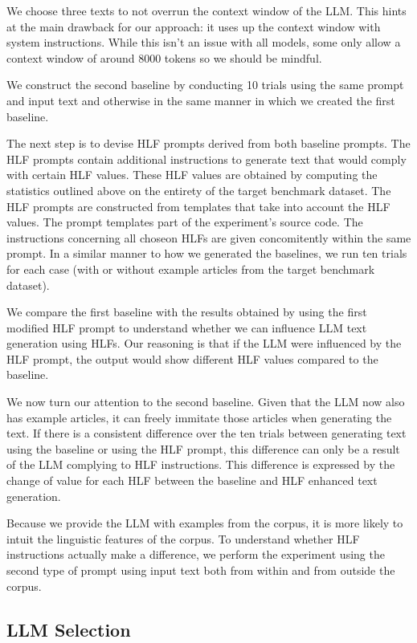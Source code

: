 \documentclass[11pt]{article}
\begin{document}
We choose three texts to not overrun the context window of the LLM.
This hints at the main drawback for our approach: it uses up the context window
with system instructions.
While this isn't an issue with all models, some only allow a context window of
around 8000 tokens so we should be mindful.

We construct the second baseline by conducting 10 trials using the same
prompt and input text and otherwise in the same manner in which we created the
first baseline.

The next step is to devise HLF prompts derived from both baseline prompts.
The HLF prompts contain additional instructions to generate text that would
comply with certain HLF values.
These HLF values are obtained by computing the statistics outlined above on
the entirety of the target benchmark dataset.
The HLF prompts are constructed from templates that take into account the HLF
values.
The prompt templates part of the experiment's source code.
The instructions concerning all choseon HLFs are given concomitently within the
same prompt.
In a similar manner to how we generated the baselines, we run ten trials for
each case (with or without example articles from the target benchmark dataset).

We compare the first baseline with the results obtained by using the first
modified HLF prompt to understand whether we can influence LLM text generation
using HLFs.
Our reasoning is that if the LLM were influenced by the HLF prompt, the output
would show different HLF values compared to the baseline.

We now turn our attention to the second baseline.
Given that the LLM now also has example articles, it can freely immitate those
articles when generating the text.
If there is a consistent difference over the ten trials between generating text
using the baseline or using the HLF prompt, this difference can only be a result
of the LLM complying to HLF instructions.
This difference is expressed by the change of value for each HLF between the
baseline and HLF enhanced text generation.

Because we provide the LLM with examples from the corpus, it is more likely to
intuit the linguistic features of the corpus.
To understand whether HLF instructions actually make a difference, we perform
the experiment using the second type of prompt using input text both from within
and from outside the corpus.

\subsection{LLM Selection}\label{llm-selection}
\end{document}
